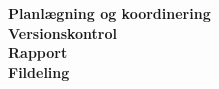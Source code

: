 \textbf{Planlægning og koordinering}\\ %

\textbf{Versionskontrol}\\  %

\textbf{Rapport}\\ %

\textbf{Fildeling}\\ %
